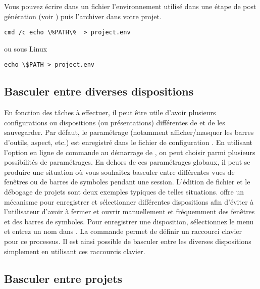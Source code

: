 Vous pouvez écrire dans un fichier  l'environnement utilisé dans une étape de post génération (voir ) puis l'archiver dans votre projet.

\begin{lstlisting}
cmd /c echo \%PATH\%  > project.env
\end{lstlisting}

ou sous Linux

\begin{lstlisting}
echo \$PATH > project.env
\end{lstlisting}

\subsection{Basculer entre diverses dispositions}

En fonction des tâches à effectuer, il peut être utile d'avoir plusieurs configurations ou dispositions (ou présentations) différentes de  \codeblocks et de les sauvegarder. Par défaut, le paramétrage (notamment afficher/masquer les barres d'outils, aspect, etc.) est enregistré dans le fichier de configuration . En utilisant l'option en ligne de commande  au démarrage de \codeblocks, on peut choisir parmi plusieurs possibilités de paramétrages. En dehors de ces paramétrages globaux, il peut se produire une situation où vous souhaitez basculer entre différentes vues de fenêtres ou de barres de symboles pendant une session. L'édition de fichier et le débogage de projets sont deux exemples typiques de telles situations. \codeblocks offre un mécanisme pour enregistrer et sélectionner différentes dispositions afin d'éviter à l'utilisateur d'avoir à fermer et ouvrir manuellement et fréquemment des fenêtres et des barres de symboles. Pour enregistrer une disposition, sélectionnez le menu  et entrez un nom dans . La commande  permet de définir un raccourci clavier pour ce processus. Il est ainsi possible de basculer entre les diverses dispositions simplement en utilisant ces raccourcis clavier.


\subsection{Basculer entre projets}


